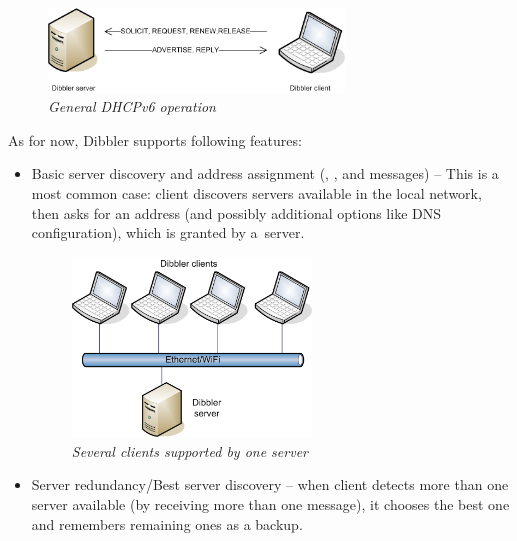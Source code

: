 \begin{figure}[ht]
\begin{center}
\includegraphics[width=0.7\textwidth]{dibbler-srv-cli}
\caption{\emph{General DHCPv6 operation}}
\end{center}
\end{figure}

As for now, Dibbler supports following features:
\begin{itemize}
\item Basic server discovery and address assignment (,
      ,  and  messages) -- This
      is a most common case: client discovers servers available in the
      local network, then asks for an address (and possibly additional
      options like DNS configuration), which is granted by a~server.

\begin{figure}[ht]
\begin{center}
\includegraphics[width=0.6\textwidth]{dibbler-multiple-cli}
\caption{\emph{Several clients supported by one server}}
\end{center}
\end{figure}

\item Server redundancy/Best server discovery -- when client detects
      more than one server available (by receiving more than one
       message), it chooses the best one and remembers
      remaining ones as a backup.


\end{itemize}
